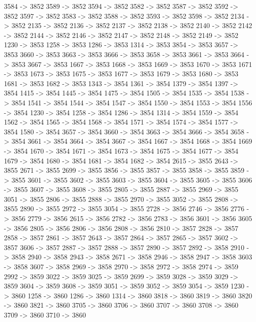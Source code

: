 {	3584 -> 3852
	3589 -> 3852
	3594 -> 3852
	3582 -> 3852
	3587 -> 3852
	3592 -> 3852
	3597 -> 3852
	3583 -> 3852
	3588 -> 3852
	3593 -> 3852
	3598 -> 3852
	2134 -> 3852
	2135 -> 3852
	2136 -> 3852
	2137 -> 3852
	2138 -> 3852
	2140 -> 3852
	2142 -> 3852
	2144 -> 3852
	2146 -> 3852
	2147 -> 3852
	2148 -> 3852
	2149 -> 3852
	1230 -> 3853
	1258 -> 3853
	1286 -> 3853
	1314 -> 3853
	3854 -> 3853
	3657 -> 3853
	3660 -> 3853
	3663 -> 3853
	3666 -> 3853
	3658 -> 3853
	3661 -> 3853
	3664 -> 3853
	3667 -> 3853
	1667 -> 3853
	1668 -> 3853
	1669 -> 3853
	1670 -> 3853
	1671 -> 3853
	1673 -> 3853
	1675 -> 3853
	1677 -> 3853
	1679 -> 3853
	1680 -> 3853
	1681 -> 3853
	1682 -> 3853
	1343 -> 3854
	1361 -> 3854
	1379 -> 3854
	1397 -> 3854
	1415 -> 3854
	1445 -> 3854
	1475 -> 3854
	1505 -> 3854
	1535 -> 3854
	1538 -> 3854
	1541 -> 3854
	1544 -> 3854
	1547 -> 3854
	1550 -> 3854
	1553 -> 3854
	1556 -> 3854
	1230 -> 3854
	1258 -> 3854
	1286 -> 3854
	1314 -> 3854
	1559 -> 3854
	1562 -> 3854
	1565 -> 3854
	1568 -> 3854
	1571 -> 3854
	1574 -> 3854
	1577 -> 3854
	1580 -> 3854
	3657 -> 3854
	3660 -> 3854
	3663 -> 3854
	3666 -> 3854
	3658 -> 3854
	3661 -> 3854
	3664 -> 3854
	3667 -> 3854
	1667 -> 3854
	1668 -> 3854
	1669 -> 3854
	1670 -> 3854
	1671 -> 3854
	1673 -> 3854
	1675 -> 3854
	1677 -> 3854
	1679 -> 3854
	1680 -> 3854
	1681 -> 3854
	1682 -> 3854
	2615 -> 3855
	2643 -> 3855
	2671 -> 3855
	2699 -> 3855
	3856 -> 3855
	3857 -> 3855
	3858 -> 3855
	3859 -> 3855
	3601 -> 3855
	3602 -> 3855
	3603 -> 3855
	3604 -> 3855
	3605 -> 3855
	3606 -> 3855
	3607 -> 3855
	3608 -> 3855
	2805 -> 3855
	2887 -> 3855
	2969 -> 3855
	3051 -> 3855
	2806 -> 3855
	2888 -> 3855
	2970 -> 3855
	3052 -> 3855
	2808 -> 3855
	2890 -> 3855
	2972 -> 3855
	3054 -> 3855
	2728 -> 3856
	2746 -> 3856
	2776 -> 3856
	2779 -> 3856
	2615 -> 3856
	2782 -> 3856
	2783 -> 3856
	3601 -> 3856
	3605 -> 3856
	2805 -> 3856
	2806 -> 3856
	2808 -> 3856
	2810 -> 3857
	2828 -> 3857
	2858 -> 3857
	2861 -> 3857
	2643 -> 3857
	2864 -> 3857
	2865 -> 3857
	3602 -> 3857
	3606 -> 3857
	2887 -> 3857
	2888 -> 3857
	2890 -> 3857
	2892 -> 3858
	2910 -> 3858
	2940 -> 3858
	2943 -> 3858
	2671 -> 3858
	2946 -> 3858
	2947 -> 3858
	3603 -> 3858
	3607 -> 3858
	2969 -> 3858
	2970 -> 3858
	2972 -> 3858
	2974 -> 3859
	2992 -> 3859
	3022 -> 3859
	3025 -> 3859
	2699 -> 3859
	3028 -> 3859
	3029 -> 3859
	3604 -> 3859
	3608 -> 3859
	3051 -> 3859
	3052 -> 3859
	3054 -> 3859
	1230 -> 3860
	1258 -> 3860
	1286 -> 3860
	1314 -> 3860
	3818 -> 3860
	3819 -> 3860
	3820 -> 3860
	3821 -> 3860
	3705 -> 3860
	3706 -> 3860
	3707 -> 3860
	3708 -> 3860
	3709 -> 3860
	3710 -> 3860
}
